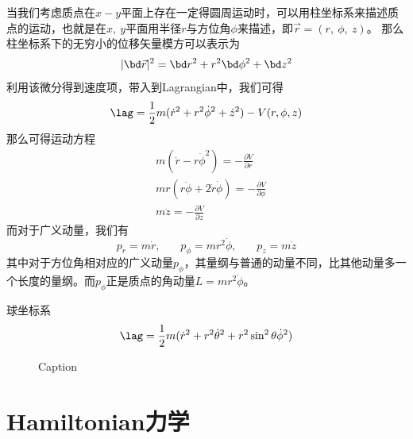当我们考虑质点在$x-y$平面上存在一定得圆周运动时，可以用柱坐标系来描述质点的运动，也就是在$x,~y$平面用半径$r$与方位角$\phi$来描述，即$\vec{r} = (r,~\phi,~z)$。
那么柱坐标系下的无穷小的位移矢量模方可以表示为
\begin{equation}
    |\bd\vec{r}|^2 = \bd r ^2 + r^2 \bd \phi^2 + \bd z ^2
\end{equation}
利用该微分得到速度项，带入到Lagrangian中，我们可得
\begin{equation}
    \lag = \frac{1}{2} m  (\dot r^2 +r^2\dot \phi^2 + \dot z^2) - V(r,\phi,z)
\end{equation}
那么可得运动方程
\begin{align}
        &m(\ddot r - r\dot\phi^2) = -\frac{\partial V}{\partial r}\\
        &mr(r\ddot \phi + 2\dot r \dot\phi)  = -\frac{\partial V}{\partial \phi}\\
        &m\ddot z = -\frac{\partial V}{\partial z}
\end{align}
而对于广义动量，我们有
\begin{equation}
    p_r  = m\dot r,~~~~~~~~
    p_\phi = mr^2\dot\phi ,~~~~~~~~
    p_z = m\dot z
\end{equation}
其中对于方位角相对应的广义动量$p_\phi$，其量纲与普通的动量不同，比其他动量多一个长度的量纲。而$p_\phi$正是质点的角动量$L=mr^2\dot\phi$。


球坐标系
\begin{equation}
    \lag = \frac{1}{2} m  (\dot r^2 +r^2\dot \theta^2 + r^2\sin^2\theta \dot \phi^2)
\end{equation}

\begin{figure}[h]
    \centering
 
    \caption{Caption}
    \label{fig:placeholder}
\end{figure}

\chapter{Hamiltonian力学}

